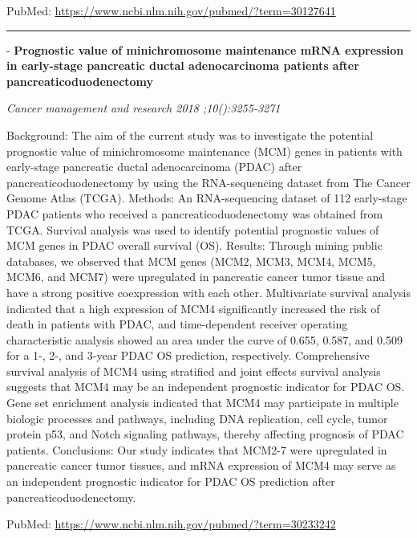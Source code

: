 \documentclass[]{article}
\begin{document}
PubMed: \url{https://www.ncbi.nlm.nih.gov/pubmed/?term=30127641}

{}

{}

\begin{center}\rule{0.5\linewidth}{\linethickness}\end{center}

 - \textbf{Prognostic value of minichromosome maintenance mRNA
expression in early-stage pancreatic ductal adenocarcinoma patients
after pancreaticoduodenectomy}

\emph{Cancer management and research 2018 ;10():3255-3271}

Background: The aim of the current study was to investigate the
potential prognostic value of minichromosome maintenance (MCM) genes in
patients with early-stage pancreatic ductal adenocarcinoma (PDAC) after
pancreaticoduodenectomy by using the RNA-sequencing dataset from The
Cancer Genome Atlas (TCGA). Methods: An RNA-sequencing dataset of 112
early-stage PDAC patients who received a pancreaticoduodenectomy was
obtained from TCGA. Survival analysis was used to identify potential
prognostic values of MCM genes in PDAC overall survival (OS). Results:
Through mining public databases, we observed that MCM genes (MCM2, MCM3,
MCM4, MCM5, MCM6, and MCM7) were upregulated in pancreatic cancer tumor
tissue and have a strong positive coexpression with each other.
Multivariate survival analysis indicated that a high expression of MCM4
significantly increased the risk of death in patients with PDAC, and
time-dependent receiver operating characteristic analysis showed an area
under the curve of 0.655, 0.587, and 0.509 for a 1-, 2-, and 3-year PDAC
OS prediction, respectively. Comprehensive survival analysis of MCM4
using stratified and joint effects survival analysis suggests that MCM4
may be an independent prognostic indicator for PDAC OS. Gene set
enrichment analysis indicated that MCM4 may participate in multiple
biologic processes and pathways, including DNA replication, cell cycle,
tumor protein p53, and Notch signaling pathways, thereby affecting
prognosis of PDAC patients. Conclusions: Our study indicates that MCM2-7
were upregulated in pancreatic cancer tumor tissues, and mRNA expression
of MCM4 may serve as an independent prognostic indicator for PDAC OS
prediction after pancreaticoduodenectomy.

PubMed: \url{https://www.ncbi.nlm.nih.gov/pubmed/?term=30233242}

{}

{}
\end{document}
